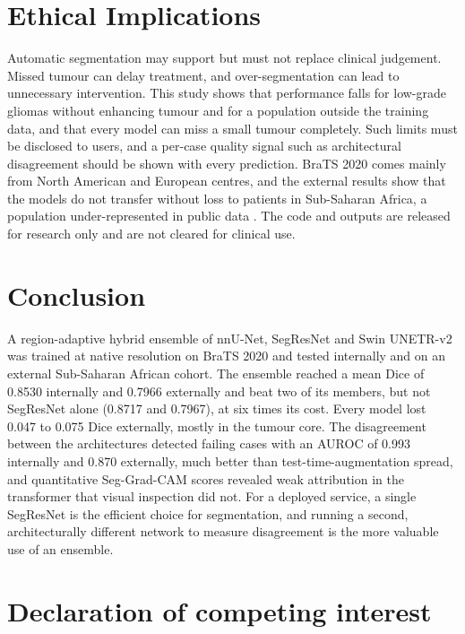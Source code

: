 \documentclass[a4paper,fleqn]{cas-sc}
\begin{document}
\section{Ethical Implications}
\label{sec:ethics}

Automatic segmentation may support but must not replace clinical judgement. Missed tumour can delay treatment, and over-segmentation can lead to unnecessary intervention. This study shows that performance falls for low-grade gliomas without enhancing tumour and for a population outside the training data, and that every model can miss a small tumour completely. Such limits must be disclosed to users, and a per-case quality signal such as architectural disagreement should be shown with every prediction. BraTS 2020 comes mainly from North American and European centres, and the external results show that the models do not transfer without loss to patients in Sub-Saharan Africa, a population under-represented in public data \citep{adewole2025}. The code and outputs are released for research only and are not cleared for clinical use.

\section{Conclusion}
\label{sec:conclusion}

A region-adaptive hybrid ensemble of nnU-Net, SegResNet and Swin UNETR-v2 was trained at native resolution on BraTS 2020 and tested internally and on an external Sub-Saharan African cohort. The ensemble reached a mean Dice of 0.8530 internally and 0.7966 externally and beat two of its members, but not SegResNet alone (0.8717 and 0.7967), at six times its cost. Every model lost 0.047 to 0.075 Dice externally, mostly in the tumour core. The disagreement between the architectures detected failing cases with an AUROC of 0.993 internally and 0.870 externally, much better than test-time-augmentation spread, and quantitative Seg-Grad-CAM scores revealed weak attribution in the transformer that visual inspection did not. For a deployed service, a single SegResNet is the efficient choice for segmentation, and running a second, architecturally different network to measure disagreement is the more valuable use of an ensemble.

\section*{Declaration of competing interest}
\end{document}
